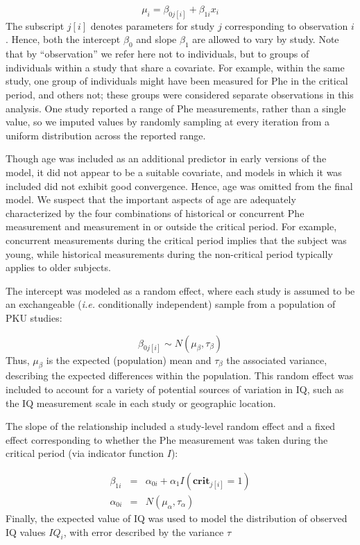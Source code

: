 \documentclass{svjour3}                     %
\begin{document}
\[
    \mu_i = \beta_{0j[i]} + \beta_{1i} x_i
\]
The subscript $j[i]$ denotes parameters for study $j$ corresponding to observation $i$. Hence, both the intercept $\beta_0$ and slope $\beta_1$ are allowed to vary by study. Note that by ``observation'' we refer here not to individuals, but to groups of individuals within a study that share a covariate. For example, within the same study, one group of individuals might have been measured for Phe in the critical period, and others not; these groups were considered separate observations in this analysis. One study \citep{Seashore:1985wf} reported a range of Phe measurements, rather than a single value, so we imputed values by randomly sampling at every iteration from a uniform distribution across the reported range.

Though age was included as an additional predictor in early versions of the model, it did not appear to be a suitable covariate, and models in which it was included did not exhibit good convergence. Hence, age was omitted from the final model. We suspect that the important aspects of age are adequately characterized by the four combinations of historical or concurrent Phe measurement and measurement in or outside the critical period. For example, concurrent measurements during the critical period implies that the subject was young, while historical measurements during the non-critical period typically applies to older subjects.

The intercept was modeled as a random effect, where each study is assumed to be an exchangeable (\emph{i.e.} conditionally independent) sample from a population of PKU studies:

\[
    \beta_{0j[i]} \sim N(\mu_{\beta}, \tau_{\beta})
\]
Thus, $\mu_{\beta}$ is the expected (population) mean and $\tau_{\beta}$ the associated variance, describing the expected differences within the population. This random effect was included to account for a variety of potential sources of variation in IQ, such as the IQ measurement scale in each study or geographic location.

The slope of the relationship included a study-level random effect and a fixed effect corresponding to whether the Phe measurement was taken during the critical period (via indicator function $I$):

\begin{eqnarray*}
    \beta_{1i} &=& \alpha_{0i} + \alpha_1 I(\textbf{crit}_{j[i]}=1) \\
    \alpha_{0i} &=& N(\mu_{\alpha},\tau_{\alpha})
\end{eqnarray*}
Finally, the expected value of IQ was used to model the distribution of observed IQ values $IQ_i$, with error described by the variance $\tau$
\end{document}
